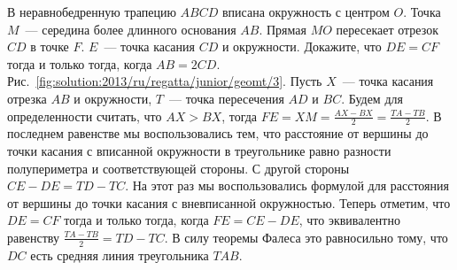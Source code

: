 \problem
В неравнобедренную трапецию $ABCD$ вписана окружность с центром $O$.
Точка $M$~--- середина более длинного основания $AB$.
Прямая $MO$ пересекает отрезок $CD$ в точке $F$.
$E$~--- точка касания $CD$ и окружности.
Докажите, что $DE = CF$ тогда и только тогда, когда $AB = 2 CD$.
%
\label{solution:2013/ru/regatta/junior/geomt/3}%
Рис.~\ref{fig:solution:2013/ru/regatta/junior/geomt/3}.
Пусть $X$~--- точка касания отрезка $AB$ и окружности, $T$~--- точка
пересечения $AD$ и $BC$.
Будем для определенности считать, что $AX > BX$, тогда
$FE = XM = \frac{AX - BX}{2} = \frac{TA - TB}{2}$.
В последнем равенстве мы воспользовались тем, что расстояние от вершины до
точки касания с вписанной окружности в треугольнике равно разности
полупериметра и соответствующей стороны.
С другой стороны $CE - DE = TD - TC$.
На этот раз мы воспользовались формулой для расстояния от вершины до точки
касания с вневписанной окружностью.
Теперь отметим, что $DE = CF$ тогда и только тогда, когда $FE = CE - DE$, что
эквивалентно равенству $\frac{TA - TB}{2} = TD - TC$.
В силу теоремы Фалеса это равносильно тому, что $DC$ есть средняя линия
треугольника $TAB$.
\endproblem
